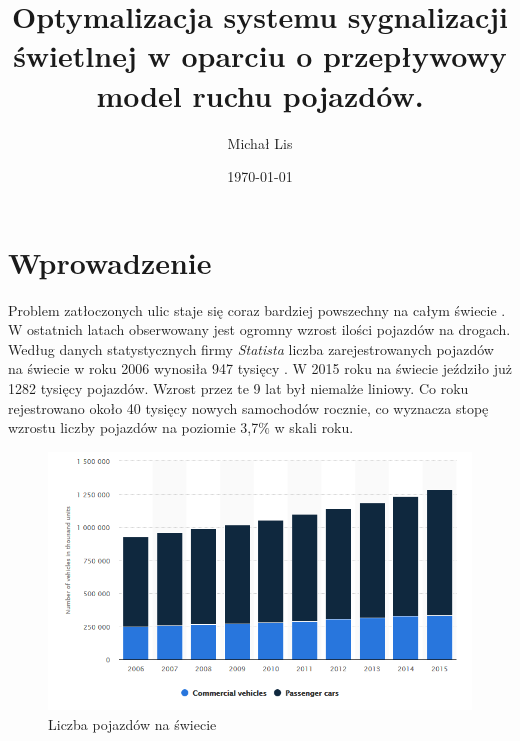 \documentclass[12pt]{book}
\theoremstyle{plain}
\begin{document}
\title{Optymalizacja  systemu sygnalizacji świetlnej w 
oparciu o przepływowy model ruchu pojazdów.}
\author{Michał Lis}
\date{\today}
\maketitle
\tableofcontents
\chapter{Wprowadzenie}
Problem zatłoczonych ulic staje się coraz bardziej powszechny na całym świecie \cite{mobility_raport2019_col}. W ostatnich latach obserwowany jest ogromny wzrost ilości pojazdów na drogach.
Według danych statystycznych firmy \textit{Statista} liczba zarejestrowanych pojazdów na świecie w roku 2006 wynosiła 947 tysięcy \cite{liczbaPojazdowSwiat}. W 2015 roku na świecie jeździło już 1282 tysięcy pojazdów. Wzrost przez te 9 lat był niemalże liniowy. Co roku rejestrowano około 40 tysięcy nowych samochodów rocznie, co wyznacza stopę wzrostu liczby pojazdów na poziomie 3,7$\%$ w skali roku.
\begin{figure}[H]
  \centering
    \includegraphics[width=14cm]{liczbaPojazdowSwiat}
 \caption{Liczba pojazdów na świecie}
 \label{fig:liczbaPojazdowSwiat}
\end{figure} \noindent
\end{document}
